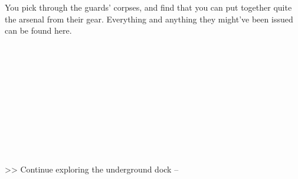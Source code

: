You pick through the guards’ corpses, and find that you can put together quite the arsenal from their gear. Everything and anything they might’ve been issued can be found here.\\
\\
\\
\\
\\
\\
\\
\\
\\
\\
\\
\\

>> Continue exploring the underground dock -- 